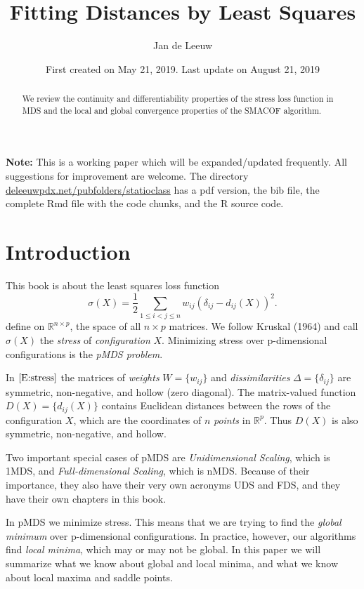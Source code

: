 \documentclass[12pt,]{article}
\title{Fitting Distances by Least Squares}
\author{Jan de Leeuw}
\date{First created on May 21, 2019. Last update on August 21, 2019}
\begin{document}
\maketitle
\begin{abstract}
We review the continuity and differentiability properties of the stress
loss function in MDS and the local and global convergence properties of
the SMACOF algorithm.
\end{abstract}

{
\setcounter{tocdepth}{3}
\tableofcontents
}
\textbf{Note:} This is a working paper which will be expanded/updated
frequently. All suggestions for improvement are welcome. The directory
\href{http://deleeuwpdx.net/pubfolders/statioclass}{deleeuwpdx.net/pubfolders/statioclass}
has a pdf version, the bib file, the complete Rmd file with the code
chunks, and the R source code.

\hypertarget{introduction}{%
\section{Introduction}\label{introduction}}

This book is about the least squares loss function
\begin{equation}\label{E:stress}\sigma(X)=\frac12\mathop{\sum}_{1\leq i<j\leq n} w_{ij}(\delta_{ij}-d_{ij}(X))^2.
\end{equation} define on \(\mathbb{R}^{n\times p}\), the space of all
\(n\times p\) matrices. We follow Kruskal (1964) and call \(\sigma(X)\)
the \emph{stress} of \emph{configuration} \(X\). Minimizing stress over
p-dimensional configurations is the \emph{pMDS problem}.

In \(\eqref{E:stress}\) the matrices of \emph{weights} \(W=\{w_{ij}\}\)
and \emph{dissimilarities} \(\Delta=\{\delta_{ij}\}\) are symmetric,
non-negative, and hollow (zero diagonal). The matrix-valued function
\(D(X)=\{d_{ij}(X)\}\) contains Euclidean distances between the rows of
the configuration \(X\), which are the coordinates of \(n\)
\emph{points} in \(\mathbb{R}^p\). Thus \(D(X)\) is also symmetric,
non-negative, and hollow.

Two important special cases of pMDS are \emph{Unidimensional Scaling},
which is 1MDS, and \emph{Full-dimensional Scaling}, which is nMDS.
Because of their importance, they also have their very own acronyms UDS
and FDS, and they have their own chapters in this book.

In pMDS we minimize stress. This means that we are trying to find the
\emph{global minimum} over p-dimensional configurations. In practice,
however, our algorithms find \emph{local minima}, which may or may not
be global. In this paper we will summarize what we know about global and
local minima, and what we know about local maxima and saddle points.
\end{document}
